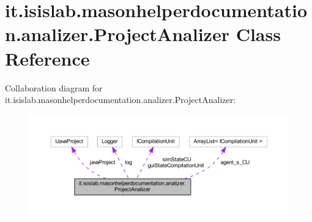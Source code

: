 \hypertarget{classit_1_1isislab_1_1masonhelperdocumentation_1_1analizer_1_1_project_analizer}{\section{it.\-isislab.\-masonhelperdocumentation.\-analizer.\-Project\-Analizer Class Reference}
\label{classit_1_1isislab_1_1masonhelperdocumentation_1_1analizer_1_1_project_analizer}
}


Collaboration diagram for it.\-isislab.\-masonhelperdocumentation.\-analizer.\-Project\-Analizer\-:\nopagebreak
\begin{figure}[H]
\begin{center}
\leavevmode
\includegraphics[width=350pt]{classit_1_1isislab_1_1masonhelperdocumentation_1_1analizer_1_1_project_analizer__coll__graph}
\end{center}
\end{figure}

